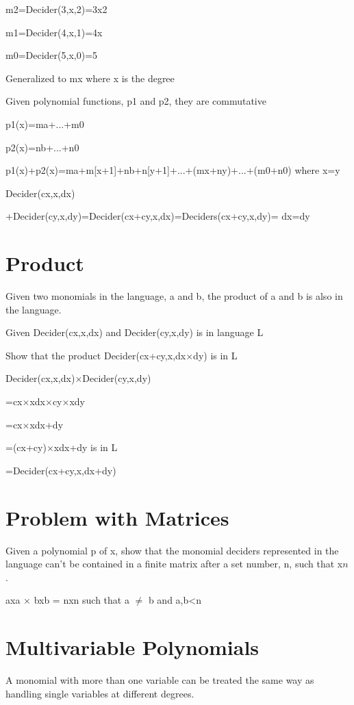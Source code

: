m2=Decider(3,x,2)=3x2

m1=Decider(4,x,1)=4x

m0=Decider(5,x,0)=5


Generalized to mx where x is the degree

Given polynomial functions, p1 and p2, they are commutative

p1(x)=ma+...+m0

p2(x)=nb+...+n0

p1(x)+p2(x)=ma+m[x+1]+nb+n[y+1]+...+(mx+ny)+...+(m0+n0) where x=y

Decider(cx,x,dx)

+Decider(cy,x,dy)=Decider(cx+cy,x,dx)=Deciders(cx+cy,x,dy)= dx=dy

\section{Product}

Given two monomials in the language, a and b, the product of a and b is also in the language.

Given Decider(cx,x,dx) and Decider(cy,x,dy) is in language L

Show that the product Decider(cx+cy,x,dx$\times $dy) is in L

Decider(cx,x,dx)$\times $Decider(cy,x,dy)

=cx$\times $xdx$\times $cy$\times $xdy

=cx$\times $xdx+dy

=(cx+cy)$\times $xdx+dy is in L

=Decider(cx+cy,x,dx+dy)

\section{Problem with Matrices}


Given a polynomial p of x, show that the monomial deciders represented in the language can't be contained in a finite matrix after a set number, n, such that x$n$.

axa $\times $ bxb = nxn such that a $\neq $ b and a,b<n

\section{Multivariable Polynomials}

A monomial with more than one variable can be treated the same way as handling single variables at different degrees.


